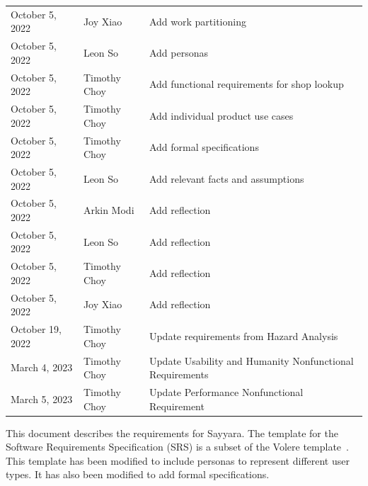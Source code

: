 \documentclass[12pt]{article}
\begin{document}
\begin{table}[H]
\begin{tabularx}{\textwidth}{llX}
		October 5, 2022    & Joy Xiao              & Add work partitioning                                                              \\
		October 5, 2022    & Leon So               & Add personas                                                                       \\
		October 5, 2022    & Timothy Choy          & Add functional requirements for shop lookup                                        \\
		October 5, 2022    & Timothy Choy          & Add individual product use cases                                                   \\
		October 5, 2022    & Timothy Choy          & Add formal specifications                                                          \\
		October 5, 2022    & Leon So               & Add relevant facts and assumptions                                                 \\
		October 5, 2022    & Arkin Modi            & Add reflection                                                                     \\
		October 5, 2022    & Leon So               & Add reflection                                                                     \\
		October 5, 2022    & Timothy Choy          & Add reflection                                                                     \\
		October 5, 2022    & Joy Xiao              & Add reflection                                                                     \\
		October 19, 2022   & Timothy Choy          & Update requirements from Hazard Analysis                                           \\
		March 4, 2023      & Timothy Choy          & Update Usability and Humanity Nonfunctional Requirements                           \\
		March 5, 2023      & Timothy Choy          & Update Performance Nonfunctional Requirement                                       \\
		\bottomrule
	\end{tabularx}
\end{table}

\newpage


This document describes the requirements for Sayyara. The template for the Software Requirements
Specification (SRS) is a subset of the Volere template~\citep{RobertsonAndRobertson2012}. This
template has been modified to include personas to represent different user types. It has also been
modified to add formal specifications.
\end{document}

